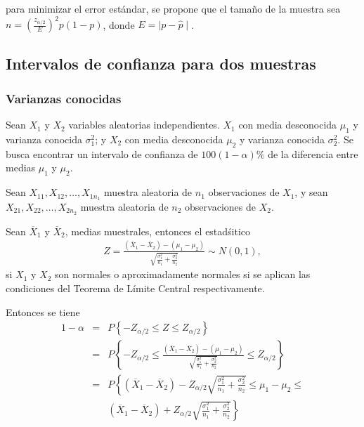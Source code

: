 \begin{itemize}
\begin{enumerate}
para minimizar el error est\'andar, se propone que el tama\~no de la muestra sea $n= \left(\frac{z_{\alpha/2}}{E}\right)^{2}p\left(1-p\right)$, donde $E=\mid p-\hat{p}\mid$.

\subsection*{Intervalos de confianza para dos muestras}
\subsubsection*{Varianzas conocidas}
Sean $X_{1}$ y $X_{2}$ variables aleatorias independientes. $X_{1}$ con media desconocida $\mu_{1}$ y varianza conocida $\sigma_{1}^{2}$; y $X_{2}$ con media desconocida $\mu_{2}$ y varianza conocida $\sigma_{2}^{2}$. Se busca encontrar un intervalo de confianza de $100\left(1-\alpha\right)\%$ de la diferencia entre medias $\mu_{1}$ y $\mu_{2}$.

Sean $X_{11},X_{12},\ldots,X_{1n_{1}}$ muestra aleatoria de $n_{1}$ observaciones de $X_{1}$, y sean $X_{21},X_{22},\ldots,X_{2n_{2}}$ muestra aleatoria de $n_{2}$ observaciones de $X_{2}$.\medskip

Sean $\overline{X}_{1}$ y $\overline{X}_{2}$, medias muestrales, entonces el estad\'sitico 
\begin{eqnarray}
Z=\frac{\left(\overline{X}_{1}-\overline{X}_{2}\right)-\left(\mu_{1}-\mu_{2}\right)}{\sqrt{\frac{\sigma_{1}^{2}}{n_{1}}+\frac{\sigma_{2}^{2}}{n_{2}}}}\sim N\left(0,1\right),\end{eqnarray}
si $X_{1}$ y $X_{2}$ son normales o aproximadamente normales si se aplican las condiciones del Teorema de L\'imite Central respectivamente. 

Entonces se tiene
\begin{eqnarray*}
1-\alpha&=& P\left\{-Z_{\alpha/2}\leq Z\leq Z_{\alpha/2}\right\}\\
&=&P\left\{-Z_{\alpha/2}\leq \frac{\left(\overline{X}_{1}-\overline{X}_{2}\right)-\left(\mu_{1}-\mu_{2}\right)}{\sqrt{\frac{\sigma_{1}^{2}}{n_{1}}+\frac{\sigma_{2}^{2}}{n_{2}}}}\leq Z_{\alpha/2}\right\}\\
&=&P\left\{\left(\overline{X}_{1}-\overline{X}_{2}\right)-Z_{\alpha/2}\sqrt{\frac{\sigma_{1}^{2}}{n_{1}}+\frac{\sigma_{2}^{2}}{n_{2}}}\leq \mu_{1}-\mu_{2}\leq\right.\\
&&\left. \left(\overline{X}_{1}-\overline{X}_{2}\right)+Z_{\alpha/2}\sqrt{\frac{\sigma_{1}^{2}}{n_{1}}+\frac{\sigma_{2}^{2}}{n_{2}}}\right\}
\end{eqnarray*}


\end{enumerate}
\end{itemize}
